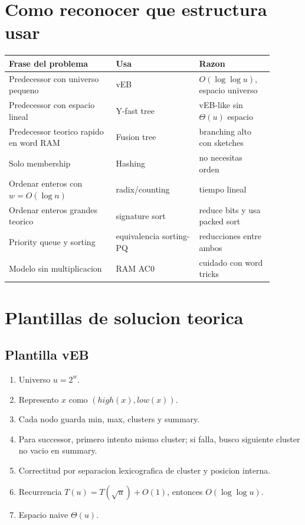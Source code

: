\documentclass[10pt]{article}
\newcommand{\bigO}{O}
\begin{document}
\newpage
\section{Como reconocer que estructura usar}

\begin{center}
\begin{tabular}{p{0.36\linewidth}p{0.28\linewidth}p{0.25\linewidth}}
\toprule
Frase del problema & Usa & Razon \\
\midrule
Predecessor con universo pequeno & vEB & $\bigO(\log\log u)$, espacio universo \\
Predecessor con espacio lineal & Y-fast tree & vEB-like sin $\Theta(u)$ espacio \\
Predecessor teorico rapido en word RAM & Fusion tree & branching alto con sketches \\
Solo membership & Hashing & no necesitas orden \\
Ordenar enteros con $w=\bigO(\log n)$ & radix/counting & tiempo lineal \\
Ordenar enteros grandes teorico & signature sort & reduce bits y usa packed sort \\
Priority queue y sorting & equivalencia sorting-PQ & reducciones entre ambos \\
Modelo sin multiplicacion & RAM AC0 & cuidado con word tricks \\
\bottomrule
\end{tabular}
\end{center}

\section{Plantillas de solucion teorica}

\subsection{Plantilla vEB}
\begin{enumerate}[leftmargin=*]
\item Universo $u=2^w$.
\item Represento $x$ como $(high(x),low(x))$.
\item Cada nodo guarda min, max, clusters y summary.
\item Para successor, primero intento mismo cluster; si falla, busco siguiente
cluster no vacio en summary.
\item Correctitud por separacion lexicografica de cluster y posicion interna.
\item Recurrencia $T(u)=T(\sqrt u)+\bigO(1)$, entonces $\bigO(\log\log u)$.
\item Espacio naive $\Theta(u)$.
\end{enumerate}
\end{document}
